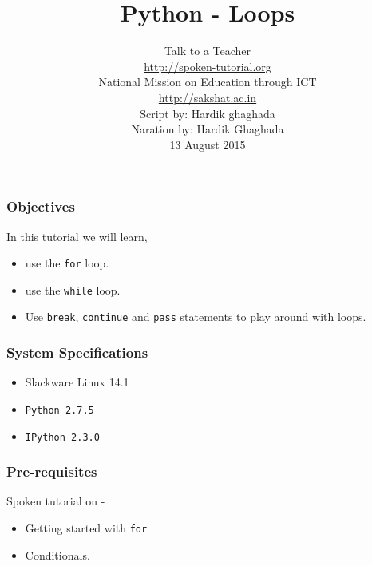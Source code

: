 \documentclass[17pt,compress]{beamer}
\author[FOSSEE]{}
\institute[IIT Bombay]{}
\date[]{}
\begin{document}
\sffamily \bfseries
\title
[Loops]
{Python - Loops}
\author
[FOSSEE, IIT - Bombay]
{\small Talk to a Teacher\\{\color{blue}\url{http://spoken-tutorial.org}}\\National Mission on Education
 through ICT\\{\color{blue}\url{http://sakshat.ac.in}} \\[0.5cm]{\tiny Script by: Hardik ghaghada \\ Naration by: Hardik Ghaghada \\ 13 August 2015}}

\begin{frame}
   \titlepage
\end{frame}
\begin{frame}
\frametitle{Objectives}
\label{sec-2}

  In this tutorial we will learn, \pause


\begin{itemize}
\item use the \texttt{for} loop.\pause
\item use the \texttt{while} loop.\pause
\item Use \texttt{break}, \texttt{continue} and \texttt{pass} statements to play around
   with loops.
\end{itemize}
\end{frame}
\begin{frame}
\frametitle{System Specifications}\pause
\begin{itemize}
\item Slackware Linux 14.1\pause
\item \texttt{Python 2.7.5} \pause
\item \texttt{IPython 2.3.0}
\end{itemize}
\end{frame}
\begin{frame}
\frametitle{Pre-requisites}
\label{sec-3}

Spoken tutorial on -

\begin{itemize}
\item Getting started with \texttt{for}\pause
\item Conditionals.
\end{itemize}
\end{frame}
\end{document}
